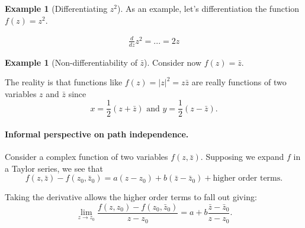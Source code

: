 \documentclass[12pt]{article}
\newcommand{\abs}[1]{ \left| #1 \right| }
\newcommand{\diff}[2]{\frac{d #1}{d #2}}
\theoremstyle{definition}
\newtheorem{exmp}[thm]{Example}
\theoremstyle{remark}
\numberwithin{equation}{section}
\begin{document}


\begin{exmp}[Differentiating $z^2$]
  As an example, let's differentiation the function $f(z)=z^2$.

  \begin{align}
    \diff{}{z}z^2 = ... = 2z
  \end{align}
\end{exmp}

\begin{exmp}[Non-differentiability of $\bar{z}$]
  Consider now $f(z)=\bar{z}$.

\end{exmp}

The reality is that functions like $f(z)=\abs{z}^2=z\bar{z}$ are really functions of two variables $z$ and $\bar{z}$ since 
\begin{equation}
  x = \frac{1}{2}(z + \bar{z}) \text{ and } y = \frac{1}{2}(z - \bar{z}).
\end{equation}


\paragraph{Informal perspective on path independence.}
Consider a complex function of two variables $f(z, \bar{z})$. Supposing we expand $f$ in a Taylor series, we see that 
\begin{equation}
  f(z, \bar{z}) - f(z_0, \bar{z}_0) = a(z-z_0) + b(\bar{z}-\bar{z}_0) + \text{higher order terms.}
\end{equation}

Taking the derivative allows the higher order terms to fall out giving:
\begin{equation}
  \lim\limits_{z\to z_0} \frac{f(z, z_0) - f(z_0, \bar{z}_0)}{z - z_0} = a + b \frac{\bar{z}-\bar{z}_0}{z-z_0}.
\end{equation}

\end{document}
